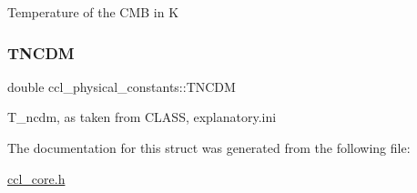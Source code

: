 Temperature of the C\+MB in K \mbox{\label{structccl__physical__constants_af7fd71a73cc9bbbb18f9419a6c1ededd}} 
\subsubsection{\texorpdfstring{T\+N\+C\+DM}{TNCDM}}
{\footnotesize\ttfamily double ccl\+\_\+physical\+\_\+constants\+::\+T\+N\+C\+DM}

T\+\_\+ncdm, as taken from C\+L\+A\+SS, explanatory.\+ini 

The documentation for this struct was generated from the following file\+:\begin{DoxyCompactItemize}
\item 
\mbox{\hyperlink{ccl__core_8h}{ccl\+\_\+core.\+h}}\end{DoxyCompactItemize}
